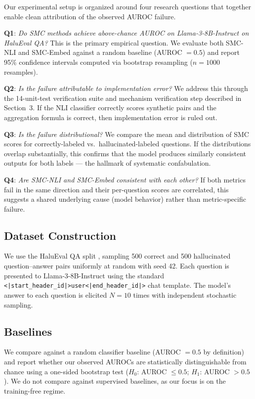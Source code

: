 Our experimental setup is organized around four research questions that together enable clean attribution of the observed AUROC failure.

\textbf{Q1}: \emph{Do SMC methods achieve above-chance AUROC on Llama-3-8B-Instruct on HaluEval QA?} This is the primary empirical question. We evaluate both SMC-NLI and SMC-Embed against a random baseline (AUROC $= 0.5$) and report 95\% confidence intervals computed via bootstrap resampling ($n = 1000$ resamples).

\textbf{Q2}: \emph{Is the failure attributable to implementation error?} We address this through the 14-unit-test verification suite and mechanism verification step described in Section~3. If the NLI classifier correctly scores synthetic pairs and the aggregation formula is correct, then implementation error is ruled out.

\textbf{Q3}: \emph{Is the failure distributional?} We compare the mean and distribution of SMC scores for correctly-labeled vs.\ hallucinated-labeled questions. If the distributions overlap substantially, this confirms that the model produces similarly consistent outputs for both labels --- the hallmark of systematic confabulation.

\textbf{Q4}: \emph{Are SMC-NLI and SMC-Embed consistent with each other?} If both metrics fail in the same direction and their per-question scores are correlated, this suggests a shared underlying cause (model behavior) rather than metric-specific failure.

\subsection{Dataset Construction}

We use the HaluEval QA split \cite{Li2023HaluEval}, sampling 500 correct and 500 hallucinated question--answer pairs uniformly at random with seed 42. Each question is presented to Llama-3-8B-Instruct using the standard \texttt{<|start\_header\_id|>user<|end\_header\_id|>} chat template. The model's answer to each question is elicited $N = 10$ times with independent stochastic sampling.

\subsection{Baselines}

We compare against a random classifier baseline (AUROC $= 0.5$ by definition) and report whether our observed AUROCs are statistically distinguishable from chance using a one-sided bootstrap test ($H_0$: AUROC $\leq 0.5$; $H_1$: AUROC $> 0.5$). We do not compare against supervised baselines, as our focus is on the training-free regime.

